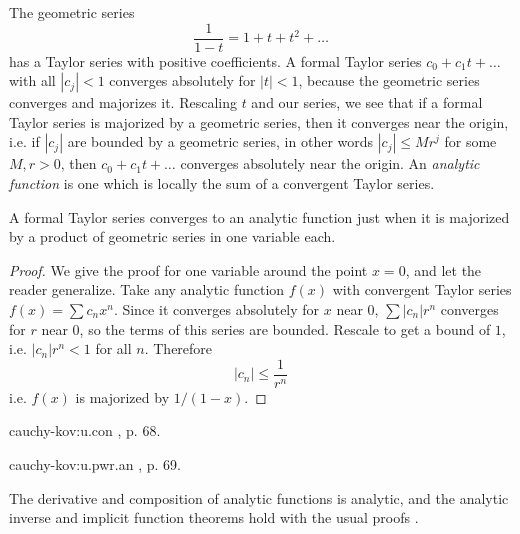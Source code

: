 The geometric series
\[
 \frac{1}{1-t}=1+t+t^2+\dots
\]
has a Taylor series with positive coefficients.
A formal Taylor series \(c_0+c_1 t + \dots\) with all \(\left|c_j\right|<1\) converges absolutely for \(|t|<1\), because the geometric series converges and majorizes it.
Rescaling \(t\) and our series, we see that if a formal Taylor series is majorized by a geometric series, then it converges near the origin, i.e. if \(\left|c_j\right|\) are bounded by a geometric series, in other words \(\left|c_j\right| \le Mr^j\) for some \(M, r>0\), then \(c_0 + c_1 t + \dots\) converges absolutely near the origin.
An \emph{analytic function} is one which is locally the sum of a convergent Taylor series.

\begin{lemma}\label{lemma:cauchy:convergent.Taylor}
A formal Taylor series converges to an analytic function just when it is majorized by a product of geometric series in one variable each.
\end{lemma}
\begin{proof}
We give the proof for one variable around the point \(x=0\), and let the reader generalize.
Take any analytic function \(f(x)\) with convergent Taylor series \(f(x)=\sum c_n x^n\).
Since it converges absolutely for \(x\) near \(0\), \(\sum \left|c_n\right| r^n\) converges for \(r\) near \(0\), so the terms of this series are bounded.
Rescale to get a bound of \(1\), i.e. \(\left|c_n\right| r^n < 1\) for all \(n\).
Therefore 
\[
\left|c_n\right| \le \frac{1}{r^n}
\]
i.e. \(f(x)\) is majorized by \(1/(1-x)\).
\end{proof}
\begin{answer}{cauchy-kov:u.con}
\cite{Serre:2006}, p. 68. 
\end{answer}
\begin{answer}{cauchy-kov:u.pwr.an}
\cite{Serre:2006}, p. 69. 
\end{answer}
The derivative and composition of analytic functions is analytic, and the analytic inverse and implicit function theorems hold with the usual proofs \cite{Krantz/Parks:2002,Serre:2006}.

